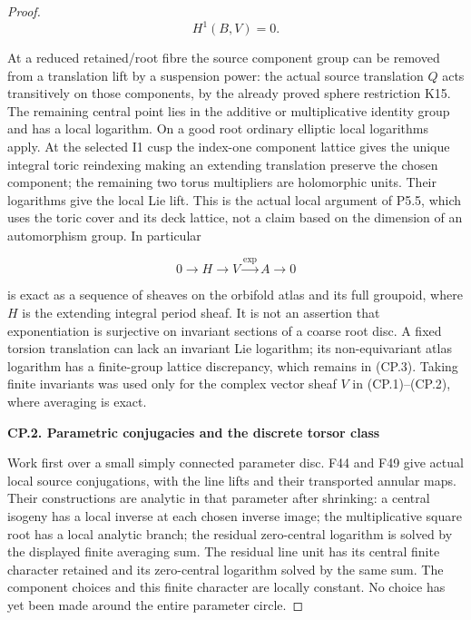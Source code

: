 \begin{proof}
\[
                       H^1(B,V)=0.                         \tag{CP.2}
\]

At a reduced retained/root fibre the source component group can be
removed from a translation lift by a suspension power: the actual
source translation \(Q\) acts transitively on those components, by the
already proved sphere restriction K15. The remaining central point
lies in the additive or multiplicative identity group and has a local
logarithm. On a good root ordinary elliptic local logarithms apply.
At the selected I1 cusp the index-one component lattice gives the
unique integral toric reindexing making an extending translation
preserve the chosen component; the remaining two torus multipliers
are holomorphic units. Their logarithms give the local Lie lift.
This is the actual local argument of P5.5, which uses the toric cover
and its deck lattice, not a claim based on the dimension of an
automorphism group. In particular

\[
 0\longrightarrow H\longrightarrow V\xrightarrow{\exp}A
       \longrightarrow0                                   \tag{CP.3}
\]

is exact as a sequence of sheaves on the orbifold atlas and its
full groupoid, where \(H\) is the extending integral period sheaf. It
is not an assertion that exponentiation is surjective on invariant
sections of a coarse root disc. A fixed torsion translation can lack
an invariant Lie logarithm; its non-equivariant atlas logarithm
has a finite-group lattice discrepancy, which remains in (CP.3).
Taking finite invariants was used only for the complex vector sheaf
\(V\) in (CP.1)--(CP.2), where averaging is exact.

\par

\medskip\noindent\textbf{CP.2. Parametric conjugacies and the discrete torsor class}

\par\nobreak

Work first over a small simply connected parameter disc. F44 and F49
give actual local source conjugations, with the line lifts and their
transported annular maps. Their constructions are analytic in that
parameter after shrinking: a central isogeny has a local inverse at
each chosen inverse image; the multiplicative square root has a local
analytic branch; the residual zero-central logarithm is solved by the
displayed finite averaging sum. The residual line unit has its
central finite character retained and its zero-central logarithm
solved by the same sum. The component choices and this finite
character are locally constant. No choice has yet been made around
the entire parameter circle.


\end{proof}
